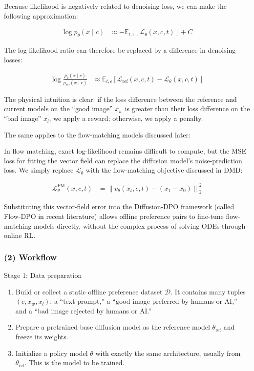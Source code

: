 Because likelihood is negatively related to denoising loss, we can make the following approximation:

\[
\begin{aligned}
\log p_\theta(x\mid c)
&\approx -\mathbb{E}_{t,\epsilon}\left[\mathcal{L}_\theta(x,c,t)\right]+C
\end{aligned}
\]

The log-likelihood ratio can therefore be replaced by a difference in denoising losses:

\[
\begin{aligned}
\log\frac{p_\theta(x\mid c)}{p_{\mathrm{ref}}(x\mid c)}
&\approx
\mathbb{E}_{t,\epsilon}
\left[
\mathcal{L}_{\mathrm{ref}}(x,c,t)-\mathcal{L}_\theta(x,c,t)
\right]
\end{aligned}
\]

The physical intuition is clear: if the loss difference between the reference and current models on the ``good image'' \(x_w\) is greater than their loss difference on the ``bad image'' \(x_l\), we apply a reward; otherwise, we apply a penalty.

The same applies to the flow-matching models discussed later:

In flow matching, exact log-likelihood remains difficult to compute, but the MSE loss for fitting the vector field can replace the diffusion model's noise-prediction loss. We simply replace \(\mathcal{L}_\theta\) with the flow-matching objective discussed in DMD:

\[
\begin{aligned}
\mathcal{L}^{\mathrm{FM}}_\theta(x,c,t)
&=\left\lVert v_\theta(x_t,c,t)-(x_1-x_0)\right\rVert_2^2
\end{aligned}
\]

Substituting this vector-field error into the Diffusion-DPO framework (called Flow-DPO in recent literature) allows offline preference pairs to fine-tune flow-matching models directly, without the complex process of solving ODEs through online RL.

\hypertarget{workflow}{%
\subsubsection{(2) Workflow}\label{workflow}}

Stage 1: Data preparation

\begin{enumerate}
\def\labelenumi{\arabic{enumi}.}
\tightlist
\item
  Build or collect a static offline preference dataset \(\mathcal{D}\). It contains many tuples \((c,x_w,x_l)\): a ``text prompt,'' a ``good image preferred by humans or AI,'' and a ``bad image rejected by humans or AI.''
\item
  Prepare a pretrained base diffusion model as the reference model \(\theta_{\mathrm{ref}}\) and freeze its weights.
\item
  Initialize a policy model \(\theta\) with exactly the same architecture, usually from \(\theta_{\mathrm{ref}}\). This is the model to be trained.
\end{enumerate}

